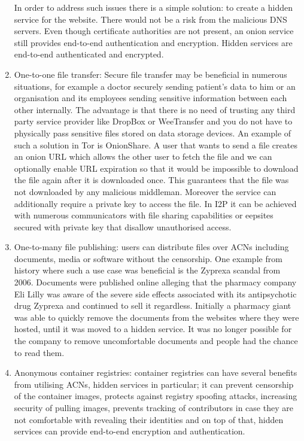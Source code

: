 \begin{enumerate}
    In order to address such issues there is a simple solution: to create a hidden service for the website. There would not be a risk from the malicious DNS servers. Even though certificate authorities are not present, an onion service still provides end-to-end authentication and encryption.
    Hidden services are end-to-end authenticated and encrypted.
    \item One-to-one file transfer: Secure file transfer may be beneficial in numerous situations, for example a doctor securely sending patient’s data to him or an organisation and its employees sending sensitive information between each other internally. The advantage is that there is no need of trusting any third party service provider like DropBox or WeeTransfer and you do not have to physically pass sensitive files stored on data storage devices.
    An example of such a solution in Tor is OnionShare. A user that wants to send a file creates an onion URL which allows the other user to fetch the file and we can optionally enable URL expiration so that it would be impossible to download the file again after it is downloaded once. This guarantees that the file was not downloaded by any malicious middleman. Moreover the service can additionally require a private key to access the file. In I2P it can be achieved with numerous communicators with file sharing capabilities or eepsites secured with private key that disallow unauthorised access.
    \item One-to-many file publishing: users can distribute files over ACNs including documents, media or software without the censorship. One example from history where such a use case was beneficial is the Zyprexa scandal from 2006. Documents were published online alleging that the pharmacy company Eli Lilly was aware of the severe side effects associated with its antipsychotic drug Zyprexa and continued to sell it regardless. Initially a pharmacy giant was able to quickly remove the documents from the websites where they were hosted, until it was moved to a hidden service. It was no longer possible for the company to remove uncomfortable documents and people had the chance to read them.
    \item Anonymous container registries: container registries can have several benefits from utilising ACNs, hidden services in particular; it can prevent censorship of the container images, protects against registry spoofing attacks, increasing security of pulling images, prevents tracking of contributors in case they are not comfortable with revealing their identities and on top of that, hidden services can provide end-to-end encryption and authentication.

\end{enumerate}
